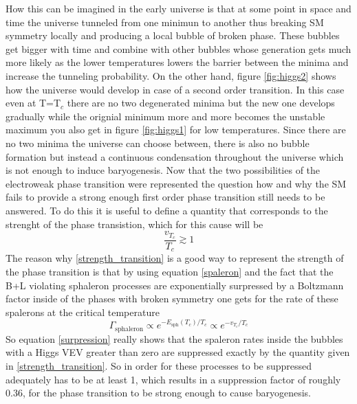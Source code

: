 How this can be imagined in the early universe is that at some point in space and time the universe tunneled from one minimun to another thus breaking SM symmetry locally and producing a local bubble of broken phase. These bubbles get bigger with time and combine with other bubbles whose generation gets much more likely as the lower temperatures lowers the barrier between the minima and increase the tunneling probability. \newline
On the other hand, figure \ref{fig:higgs2} shows how the universe would develop in case of a second order transition. In this case even at T=T$_c$ there are no two degenerated minima but the new one develops gradually while the orignial minimum more and more becomes the unstable maximum you also get in figure \ref{fig:higgs1} for low temperatures. Since there are no two minima the universe can choose between, there is also no bubble formation but instead a continuous condensation throughout the universe which is not enough to induce baryogenesis. \newline
Now that the two possibilities of the electroweak phase transition were represented the question how and why the SM fails to provide a strong enough first order phase transition still needs to be answered. \newline
To do this it is useful to define a quantity that corresponds to the strenght of the phase transistion, which for this cause will be 
\begin{equation}
	\frac{v_{T_c}}{T_c}\gtrsim1
	\label{strength_transition}
\end{equation}
The reason why \ref{strength_transition} is a good way to represent the strength of the phase transition is that by using equation \ref{spaleron} and the fact that the B+L violating sphaleron processes are exponentially surpressed by a Boltzmann factor inside of the phases with broken symmetry one gets for the rate of these spalerons at the critical temperature
\begin{equation}
	\Gamma_\text{sphaleron}\propto e^{-E_\text{sph}(T_c)/T_c}\propto e^{-v_{T_c}/T_c}
	\label{surpression}
\end{equation}
So equation \ref{surpression} really shows that the spaleron rates inside the bubbles with a Higgs VEV greater than zero are suppressed exactly by the quantity given in \ref{strength_transition}. So in order for these processes to be suppressed adequately has to be at least 1, which results in a suppression factor of roughly 0.36, for the phase transition to be strong enough to cause baryogenesis. \newline 
